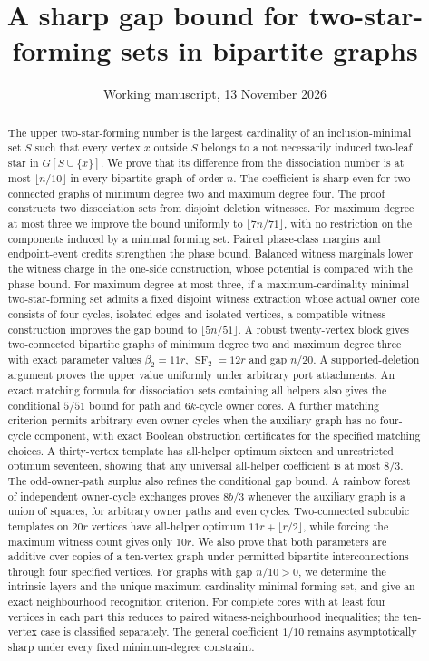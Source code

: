 \documentclass[11pt]{article}
\title{A sharp gap bound for two-star-forming sets in bipartite graphs}
\author{}
\date{Working manuscript, 13 November 2026}
\newcommand{\SF}{\operatorname{SF}_2}
\newcommand{\diss}{\beta_2}
\begin{document}
\maketitle
\begin{abstract}
The upper two-star-forming number is the largest cardinality of an
inclusion-minimal set $S$ such that every vertex $x$ outside $S$ belongs to a
not necessarily induced two-leaf star in $G[S\cup\{x\}]$. We prove that its
difference from the dissociation number is at most $\lfloor n/10\rfloor$
in every bipartite graph of order $n$. The coefficient is sharp even for
two-connected graphs of minimum degree two and maximum degree four. The
proof constructs two dissociation sets from disjoint deletion witnesses.
For maximum degree at most three we improve the bound uniformly to
$\lfloor7n/71\rfloor$, with no restriction on the components induced
by a minimal forming set. Paired phase-class margins and endpoint-event
credits strengthen the phase bound. Balanced witness marginals lower the
witness charge in the one-side construction, whose potential is compared
with the phase bound. For maximum degree at most three, if a
maximum-cardinality minimal two-star-forming set admits a fixed disjoint
witness extraction whose actual owner core consists of four-cycles,
isolated edges and isolated vertices, a compatible witness construction
improves the gap bound to $\lfloor5n/51\rfloor$.
A robust twenty-vertex block gives two-connected bipartite graphs of
minimum degree two and maximum degree three with exact parameter values
$\diss=11r$, $\SF=12r$ and gap $n/20$. A supported-deletion argument
proves the upper value uniformly under arbitrary port attachments.
An exact matching formula for dissociation sets containing all helpers
also gives the conditional $5/51$ bound for path and $6k$-cycle owner cores.
A further matching criterion permits arbitrary even owner cycles when the
auxiliary graph has no four-cycle component, with exact Boolean obstruction
certificates for the specified matching choices.
A thirty-vertex template has all-helper optimum sixteen and unrestricted
optimum seventeen, showing that any universal all-helper coefficient is at
most $8/3$. The odd-owner-path surplus also refines the conditional gap bound.
A rainbow forest of independent owner-cycle exchanges proves $8b/3$ whenever
the auxiliary graph is a union of squares, for arbitrary owner paths and even cycles.
Two-connected subcubic templates on $20r$ vertices have all-helper optimum
$11r+\lfloor r/2\rfloor$, while forcing the maximum witness count gives only $10r$.
We also prove that both parameters are additive over copies of a ten-vertex
graph under permitted bipartite interconnections through four specified vertices.
For graphs with gap $n/10>0$, we determine the intrinsic layers and
the unique maximum-cardinality minimal forming set, and give an exact
neighbourhood recognition criterion. For complete cores with at least
four vertices in each part this reduces to paired witness-neighbourhood
inequalities; the ten-vertex case is classified separately. The general coefficient
$1/10$ remains asymptotically sharp under every fixed minimum-degree constraint.
\end{abstract}
\end{document}

